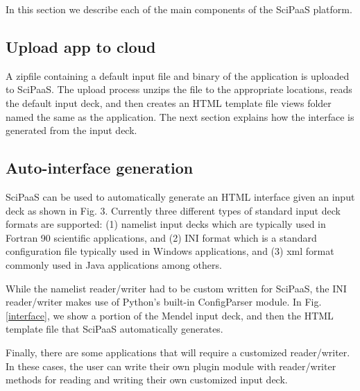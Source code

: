 \documentclass[10pt,reprint]{socc14}
\begin{document}
In this section we describe each of the main components of the SciPaaS platform.

\subsection{Upload app to cloud}

A zipfile containing a default input file and binary of the application is uploaded to SciPaaS.  The upload process unzips the file to the appropriate locations, reads the default input deck, and then creates an HTML template file views folder named the same as the application.  The next section explains how the interface is generated from the input deck.

\subsection{Auto-interface generation}

SciPaaS can be used to automatically generate an HTML interface given an input deck as shown in Fig. 3.  Currently three different types of standard input deck formats are supported: (1) namelist input decks which are typically used in Fortran 90 scientific applications, and (2) INI format which is a standard configuration file typically used in Windows applications, and (3) xml format commonly used in Java applications among others.

While the namelist reader/writer had to be custom written for SciPaaS, the INI reader/writer makes use of Python’s built-in ConfigParser module.  In Fig. \ref{interface}, we show a portion of the Mendel input deck, and then the HTML template file that SciPaaS automatically generates.

Finally, there are some applications that will require a customized reader/writer.  In these cases, the user can write their own plugin module with reader/writer methods for reading and writing their own customized input deck.
\end{document}
